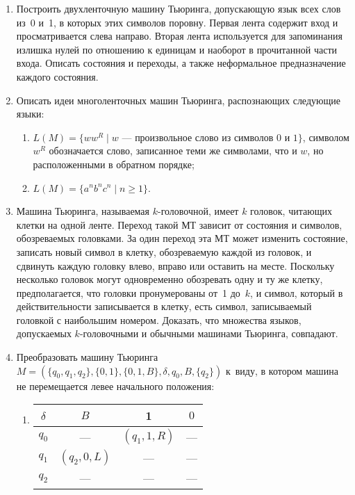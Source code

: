 \documentclass[12pt,a4paper]{article}
\begin{document}
\begin{enumerate}
\item Построить двухленточную машину Тьюринга, допускающую язык всех слов
  из~0 и~1, в которых этих символов поровну. Первая лента содержит вход и просматривается
  слева направо. Вторая лента используется для запоминания излишка нулей по отношению к 
  единицам и наоборот в прочитанной части входа. Описать состояния и переходы, а также
  неформальное предназначение каждого состояния. 

\item Описать идеи многоленточных машин Тьюринга, распознающих следующие языки:
  \begin{enumerate}
  \item  $L(M)=\{ww^R\mid w \mbox{\ --- произвольное слово из символов 0 и 1}\}$, символом
    $w^R$ обозначается слово, записанное теми же символами, что и $w$, но расположенными в обратном 
    порядке;
  \item $L(M)=\{a^nb^nc^n\mid n\geqslant 1\}$.
  \end{enumerate}

\item Машина Тьюринга, называемая $k$-головочной, имеет $k$ головок, читающих клетки на одной
ленте. Переход такой МТ зависит от состояния и символов, обозреваемых головками. За один переход
эта МТ может изменить состояние, записать новый символ в клетку, обозреваемую каждой из головок, 
и сдвинуть каждую головку влево, вправо или оставить на месте. Поскольку несколько головок могут
одновременно обозревать одну и ту же клетку, предполагается, что головки пронумерованы от~1
 до~$k$, и символ, который в действительности записывается в клетку, есть символ, записываемый
головкой с наибольшим номером. Доказать, что множества языков, допускаемых $k$-головочными
и обычными машинами Тьюринга, совпадают.

\item  Преобразовать машину Тьюринга
$M=\left(\{q_0, q_1, q_2\},\{0,1\},\{0,1,B\},\delta,q_0,B,\{q_2\}\right)$
к~виду, в котором машина не перемещается 
левее начального положения:
\begin{multicols}{2}
  \begin{enumerate}
  \item 
  \begin{tabular}[t]{c||c|c|c}
     $\delta$ & $B$ & 1 & $0$\\
    \hline\hline
    $q_0$ & --- &$(q_1,1,R)$& --- \\
    $q_1$ &$(q_2,0,L)$  & --- & --- \\
    $q_2$ & --- & --- & ---\\
  \end{tabular}


\end{enumerate}
\end{multicols}
\end{enumerate}
\end{document}
